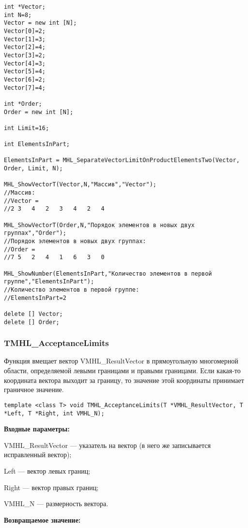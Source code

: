 \documentclass[a4paper,12pt]{article}
\begin{document}
\begin{lstlisting}[label=code_use_MHL_SeparateVectorLimitOnProductElementsTwo,caption=Пример использования]
int *Vector;
int N=8;
Vector = new int [N];
Vector[0]=2;
Vector[1]=3;
Vector[2]=4;
Vector[3]=2;
Vector[4]=3;
Vector[5]=4;
Vector[6]=2;
Vector[7]=4;

int *Order;
Order = new int [N];

int Limit=16;

int ElementsInPart;

ElementsInPart = MHL_SeparateVectorLimitOnProductElementsTwo(Vector, Order, Limit, N);

MHL_ShowVectorT(Vector,N,"Массив","Vector");
//Массив:
//Vector =
//2	3	4	2	3	4	2	4

MHL_ShowVectorT(Order,N,"Порядок элементов в новых двух группах","Order");
//Порядок элементов в новых двух группах:
//Order =	
//7	5	2	4	1	6	3	0

MHL_ShowNumber(ElementsInPart,"Количество элементов в первой группе","ElementsInPart");
//Количество элементов в первой группе:
//ElementsInPart=2

delete [] Vector;
delete [] Order;
\end{lstlisting}

\subsubsection{TMHL\_AcceptanceLimits}\label{TMHL_AcceptanceLimits}

Функция вмещает вектор VMHL\_ResultVector в прямоугольную многомерной области, определяемой левыми границами и правыми границами. Если какая-то координата вектора выходит за границу, то значение этой координаты принимает граничное значение.


\begin{lstlisting}[label=code_syntax_TMHL_AcceptanceLimits,caption=Синтаксис]
template <class T> void TMHL_AcceptanceLimits(T *VMHL_ResultVector, T *Left, T *Right, int VMHL_N);
\end{lstlisting}

\textbf{Входные параметры:}  
 
VMHL\_ResultVector --- указатель на вектор (в него же записывается исправленный вектор);
 
Left --- вектор левых границ;
 
Right --- вектор правых границ;
 
VMHL\_N --- размерность вектора.

\textbf{Возвращаемое значение:}
\end{document}
